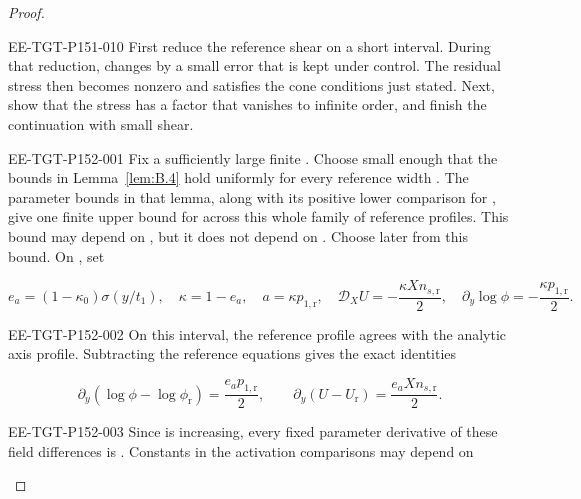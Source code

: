 \begin{proof}
\begin{EESegment}{EE-TGT-P151-010}
First reduce the reference shear on a short interval. During that reduction,
 changes by a small error that is kept under control. The residual stress
then becomes nonzero and satisfies the cone conditions just stated. Next, show that the stress has a
factor that vanishes to infinite order, and finish the continuation with small shear.
\end{EESegment}

%
\begin{EESegment}{EE-TGT-P152-001}
Fix a sufficiently large finite . Choose
 small enough that the bounds in Lemma~\ref{lem:B.4} hold
uniformly for every reference width . The parameter bounds in
that lemma, along with its positive lower comparison for , give
one finite upper bound  for
 across this whole family of reference profiles. This bound may
depend on , but it does not depend on
. Choose  later from this bound. On
, set
\end{EESegment}
\begin{equation}
  e_a=(1-\kappa_0)\sigma(y/t_1),\quad
  \kappa=1-e_a,\quad
  a=\kappa p_{1,\mathrm r},\quad
  \mathcal D_XU=-\frac{\kappa Xn_{s,\mathrm r}}{2},\quad
  \partial_y\log\phi=-\frac{\kappa p_{1,\mathrm r}}{2}.
\tag{B.26}\label{eq:B.26}
\end{equation}
\begin{EESegment}{EE-TGT-P152-002}
On this interval, the reference profile agrees with the analytic axis profile. Subtracting the
reference equations gives the exact identities
\end{EESegment}
\begin{equation}
  \partial_y(\log\phi-\log\phi_{\mathrm r})=\frac{e_ap_{1,\mathrm r}}{2},
  \qquad
  \partial_y(U-U_{\mathrm r})=\frac{e_aXn_{s,\mathrm r}}{2}.
\tag{B.27}\label{eq:B.27}
\end{equation}
\begin{EESegment}{EE-TGT-P152-003}
Since  is increasing, every fixed parameter derivative of these field
differences is . Constants in the activation comparisons may depend on

\end{EESegment}
\end{proof}
